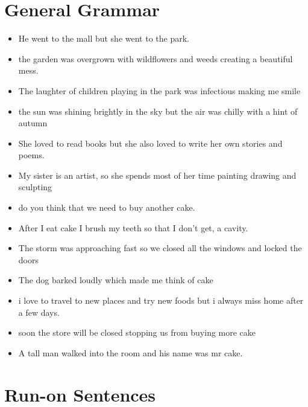 \documentclass[letterpaper, 17pt]{article}
\begin{document}
\section*{General Grammar}

\begin{itemize}
	\item He went to the mall but she went to the park.	%

	\item the garden was overgrown with wildflowers and weeds creating a beautiful mess.	%

	\item The laughter of children playing in the park was infectious making me smile	%

	\item the sun was shining brightly in the sky but the air was chilly with a hint of autumn	%

	\item She loved to read books but she also loved to write her own stories and poems.	%

	\item My sister is an artist, so she spends most of her time painting drawing and sculpting	%

	\item do you think that we need to buy another cake.	%

	\item After I eat cake I brush my teeth so that I don't get, a cavity.	%

	\item The storm was approaching fast so we closed all the windows and locked the doors	%

	\item The dog barked loudly which made me think of cake	%

	\item i love to travel to new places and try new foods but i always miss home after a few days.	%

	\item soon the store will be closed stopping us from buying more cake	%

	\item A tall man walked into the room and his name was mr cake.	%
\end{itemize}

\newpage
\section*{Run-on Sentences}
\end{document}
